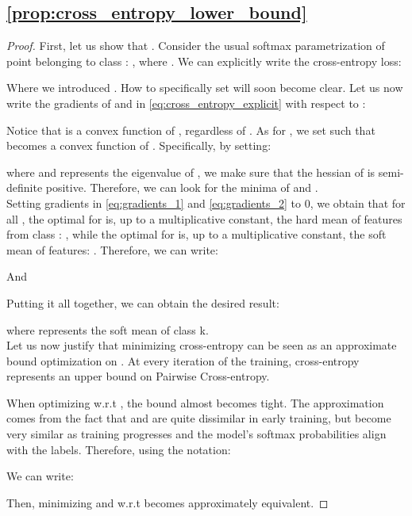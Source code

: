 \documentclass[runningheads]{llncs}
\begin{document}
    \subsection{\autoref{prop:cross_entropy_lower_bound}}\label{appendix:proof_cross_entropy_lower_bound}
        \begin{proof}
        First, let us show that . 
        Consider the usual softmax parametrization of point  belonging to class : , where . We can explicitly write the cross-entropy loss:
        
        Where we introduced . How to specifically set  will soon become clear. Let us now write the gradients of  and  in \autoref{eq:cross_entropy_explicit} with respect to :
        
        Notice that  is a convex function of , regardless of . As for , we set  such that  becomes a convex function of . Specifically, by setting:
        
        where  and  represents the  eigenvalue of , we make sure that the hessian of  is semi-definite positive. Therefore, we can look for the minima of  and .\\
        
        Setting gradients in \autoref{eq:gradients_1} and \autoref{eq:gradients_2} to 0, we obtain that for all , the optimal  for  is, up to a multiplicative constant, the hard mean of features from class : , while the optimal  for  is, up to a multiplicative constant, the soft mean of features: . Therefore, we can 
        write:
        
        And 
        
        Putting it all together, we can obtain the desired result:
        
        where  represents the soft mean of class k.  \\
        
        Let us now justify that minimizing cross-entropy can be seen as an approximate bound optimization on . At every iteration  of the training, cross-entropy represents an upper bound on Pairwise Cross-entropy.
        
        
        When optimizing w.r.t , the bound almost becomes tight. The approximation comes from the fact that  and  are quite dissimilar in early training, but become very similar as training progresses and the model's softmax probabilities align with the labels. Therefore, using the notation:
        
        We can write:
        
        Then, minimizing  and  w.r.t  becomes approximately equivalent.
        \end{proof}
    
\end{document}
